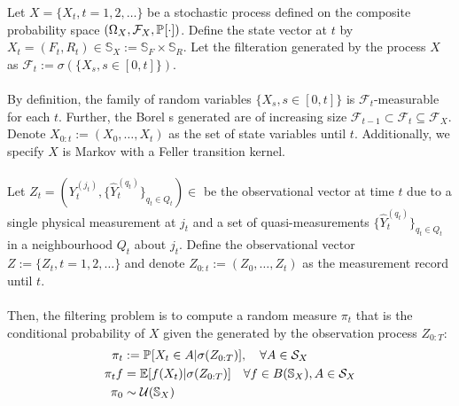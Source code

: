 \begin{defn} \label{qslam:filteringprob}
Let $X = \{X_t, t = 1, 2, \hdots \}$ be a stochastic process defined on the composite probability space $(\Omega_{X}, \mathcal{F}_{X}, \mathbb{P}_{{}}{[\cdot]})$. 
Define the state vector at $t$  by $X_t = (F_t, R_t) \in \mathbb{S}_{X} := \mathbb{S}_{F} \times \mathbb{S}_{R}$. Let the filteration generated by the process $X$ as $\mathcal{F}_{t} := \sigma(\{X_s, s\in[0, t]\})$. \\
\\
By definition, the family of random variables $\{X_s, s\in[0, t]\}$ is $\mathcal{F}_{t}$-measurable for each $t$. Further, the Borel \ofield{}s generated  are of increasing size  $\mathcal{F}_{t-1} \subset \mathcal{F}_{t} \subseteq \mathcal{F}_{X}$. Denote  $X_{0:t} := (X_0, \hdots, X_t)$ as the set of state variables until $t$. Additionally, we specify $X$ is Markov with a Feller transition kernel.\\
\\
Let $Z_t = (Y_t^{(j_t)}, \{\hat{Y}_t^{(q_t)}\}_{q_t \in Q_t}) \in $ be the observational vector at time $t$ due to a single physical measurement at $j_t$ and a set of quasi-measurements $\{\hat{Y}_t^{(q_t)}\}_{q_t \in Q_t}$ in a neighbourhood $Q_t$ about $j_t$. Define the observational vector $Z := \{ Z_t, t = 1, 2, \hdots \}$ and denote  $Z_{0:t} := (Z_0, \hdots, Z_t)$ as the measurement record until $t$.\\
\\
Then, the filtering problem is to compute a random measure $\pi_t$ that is the conditional probability of  $X$ given the \ofield{} generated by the observation process $Z_{0:T}$:
\begin{align}
\pi_t &:= \mathbb{P}_{{}}{[X_t \in A | \sigma(Z_{0:T})]}, \quad \forall A \in \mathcal{S}_X \\
\pi_t f &= \mathbb{E}[f(X_t) |  \sigma(Z_{0:T})] \quad \forall f \in B(\mathbb{S}_X), A \in \mathcal{S}_X \\
\pi_0 & \sim \mathcal{U}(\mathbb{S}_X)
\end{align}


\end{defn}
